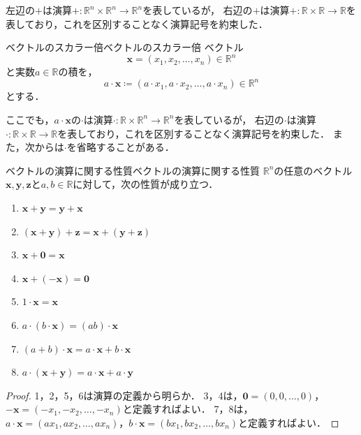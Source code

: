 \begin{remark}[記号$+$の使い分け]
  左辺の$+$は演算$+ \colon \mathbb{R}^n \times \mathbb{R}^n \to \mathbb{R}^n$を表しているが，
  右辺の$+$は演算$+ \colon  \mathbb{R} \times \mathbb{R} \to \mathbb{R}$を表しており，これを区別することなく演算記号を約束した．
\end{remark}

\begin{definition}{ベクトルのスカラー倍}{ベクトルのスカラー倍}
  ベクトル
  \[
    \bm{x} = (x_1,x_2,\ldots,x_n) \in \mathbb{R}^n
  \]
  と実数$ a \in \mathbb{R}$の積を，
  \[
    a  \cdot  \bm{x} \coloneqq (a \cdot  x_1,a\cdot  x_2,\ldots,a \cdot  x_n) \in \mathbb{R}^n
  \]
  とする．
\end{definition}

\begin{remark}
  ここでも，$a \cdot \bm{x}$の$ \cdot $は演算$\cdot  \colon \mathbb{R} \times   \mathbb{R}^n \to \mathbb{R}^n$を表しているが，
  右辺の$\cdot $は演算$\cdot \colon \mathbb{R} \times  \mathbb{R} \to \mathbb{R}$を表しており，これを区別することなく演算記号を約束した．
  また，次からは$\cdot $を省略することがある．
\end{remark}

\newpage

\begin{theorem}{ベクトルの演算に関する性質}{ベクトルの演算に関する性質}
  $\mathbb{R}^n$の任意のベクトル$\bm{x},\bm{y},\bm{z}$と$a,b \in \mathbb{R}$に対して，次の性質が成り立つ．
  \begin{enumerate}
    \item $\bm{x}+\bm{y} = \bm{y}+\bm{x}$
    \item $(\bm{x}+\bm{y})+\bm{z} = \bm{x}+(\bm{y}+\bm{z})$
    \item $\bm{x}+\bm{0} = \bm{x}$
    \item $\bm{x}+(-\bm{x}) = \bm{0}$
    \item $1 \cdot \bm{x} = \bm{x}$
    \item $a \cdot (b \cdot \bm{x}) = (ab) \cdot \bm{x}$
    \item $(a+b) \cdot \bm{x} = a \cdot \bm{x} + b \cdot \bm{x}$
    \item $a \cdot (\bm{x}+\bm{y}) = a \cdot \bm{x} + a \cdot \bm{y}$
  \end{enumerate}
\end{theorem}

\begin{leftbar}
  \begin{proof}
    1，2，5，6は演算の定義から明らか．
    3，4は，$\bm{0} = (0,0,\ldots,0)$，$-\bm{x} = (-x_1,-x_2,\ldots,-x_n)$と定義すればよい．
    7，8は，$a \cdot \bm{x} = (ax_1,ax_2,\ldots,ax_n)$，$b \cdot \bm{x} = (bx_1,bx_2,\ldots,bx_n)$と定義すればよい．
  \end{proof}
\end{leftbar}

